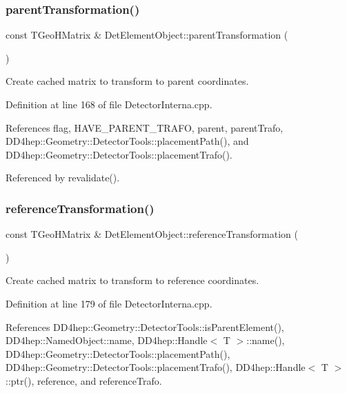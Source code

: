 \subsubsection{\texorpdfstring{parent\+Transformation()}{parentTransformation()}}
{\footnotesize\ttfamily const T\+Geo\+H\+Matrix \& Det\+Element\+Object\+::parent\+Transformation (\begin{DoxyParamCaption}{ }\end{DoxyParamCaption})}



Create cached matrix to transform to parent coordinates. 



Definition at line 168 of file Detector\+Interna.\+cpp.



References flag, H\+A\+V\+E\+\_\+\+P\+A\+R\+E\+N\+T\+\_\+\+T\+R\+A\+FO, parent, parent\+Trafo, D\+D4hep\+::\+Geometry\+::\+Detector\+Tools\+::placement\+Path(), and D\+D4hep\+::\+Geometry\+::\+Detector\+Tools\+::placement\+Trafo().



Referenced by revalidate().

\hypertarget{class_d_d4hep_1_1_geometry_1_1_det_element_object_a728e600b6e565f6fb2174e36422ef1bc}{}\label{class_d_d4hep_1_1_geometry_1_1_det_element_object_a728e600b6e565f6fb2174e36422ef1bc} 
\subsubsection{\texorpdfstring{reference\+Transformation()}{referenceTransformation()}}
{\footnotesize\ttfamily const T\+Geo\+H\+Matrix \& Det\+Element\+Object\+::reference\+Transformation (\begin{DoxyParamCaption}{ }\end{DoxyParamCaption})}



Create cached matrix to transform to reference coordinates. 



Definition at line 179 of file Detector\+Interna.\+cpp.



References D\+D4hep\+::\+Geometry\+::\+Detector\+Tools\+::is\+Parent\+Element(), D\+D4hep\+::\+Named\+Object\+::name, D\+D4hep\+::\+Handle$<$ T $>$\+::name(), D\+D4hep\+::\+Geometry\+::\+Detector\+Tools\+::placement\+Path(), D\+D4hep\+::\+Geometry\+::\+Detector\+Tools\+::placement\+Trafo(), D\+D4hep\+::\+Handle$<$ T $>$\+::ptr(), reference, and reference\+Trafo.

